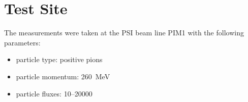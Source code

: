 \section{Test Site}

The measurements were taken at the \ac{PSI} beam line PIM1 with the following parameters:
\begin{itemize}
	\item particle type: positive pions
	\item particle momentum: \SI{260}{\mega\electronvolt}
	\item particle fluxes: \SIrange{10}{20000}{\khzcm}
\end{itemize}





